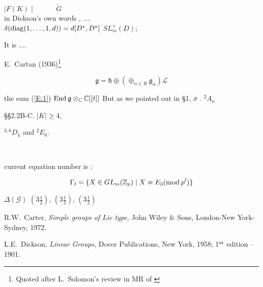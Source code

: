 \documentclass[12pt]{report}
\begin{document}
$\mid F(K) \mid \quad \quad \quad \tilde{G}$\\
\indent
in Dickson's own words \cite{D}, ....\\
$\delta({\rm diag}(1, \ldots , 1, d)) = d [D^* , D^*]$ 
$SL_m^+(D);$\\

\hfill{\parbox[t]{7cm}{\rm It is .... }}

\vskip3mm

\hskip180pt E.~Cartan (1936)\footnote{Quoted after L.~Solomon's 
review in MR of \cite{Ca}}

\bigskip 
$$
{\mathfrak g} = {\mathfrak h} \oplus (\oplus_{\alpha \in R} 
{\mathfrak g}_{\alpha}){\mathcal L}$$
 
the sum (\ref{E:1})
${\rm End}\: {\mathfrak g} \otimes_{\mathbb C} {\mathbb C}[[t]]$
But as we pointed out in \S 1, 
$\bar{\sigma}$ 
$\bar{\ }$ 
$^2\!A_n$
 

\medskip

\S\S 2.2B-C. 
$\mid K \mid \geqslant 4,$ 

$^{3,6}\!D_4$ and $^2\!E_6.$ 

\theequation\\

\setcounter{equation}{10}

current equation number is : \theequation

$$
\Gamma_l = \{ X \in GL_m({\mathbb Z}_p) \mid X \equiv E_3 ({\rm mod}\: 
p^l) \}
$$

$\Delta({\mathcal G})$ 
$\displaystyle (3\frac{1}{2})$,
$\displaystyle \left( 3\frac{1}{2} \right)$,
$(3\frac{1}{2})$


\smallskip 


\begin{thebibliography}{100}


 R.W.~Carter, {\it Simple groups of Lie type,} 
John Wiley \& Sons, London-New York-Sydney, 1972. 

 L.E.~Dickson, {\it Linear Groups,} Dover Publications, New 
York, 1958; 1$^{\rm st}$ edition -- 1901. 

\end{thebibliography} 


  
\end{document}
